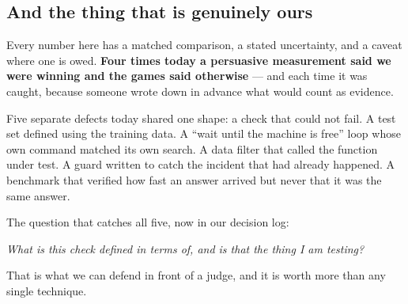 \documentclass[11pt,a4paper]{article}
\begin{document}
\subsection{And the thing that is genuinely ours}

Every number here has a matched comparison, a stated uncertainty, and a caveat where one is owed.
\textbf{Four times today a persuasive measurement said we were winning and the games said
otherwise} --- and each time it was caught, because someone wrote down in advance what would count
as evidence.

Five separate defects today shared one shape: a check that could not fail. A test set defined
using the training data. A ``wait until the machine is free'' loop whose own command matched its
own search. A data filter that called the function under test. A guard written to catch the
incident that had already happened. A benchmark that verified how fast an answer arrived but never
that it was the same answer.

The question that catches all five, now in our decision log:

\begin{center}
\emph{What is this check defined in terms of, and is that the thing I am testing?}
\end{center}

That is what we can defend in front of a judge, and it is worth more than any single technique.
\end{document}
